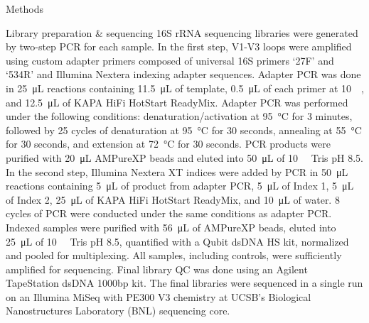 \documentclass[oneside,12pt,final]{sty/ucthesis-CA2012}
\begin{document}
\begin{mainmatter}
\begin{section}{Methods}
\begin{subsection}{Library preparation \& sequencing}
16S rRNA sequencing libraries were generated by two-step PCR for each sample. In the first step, V1-V3 loops were amplified using custom adapter primers composed of universal 16S primers ‘27F’ and ‘534R’ and Illumina Nextera indexing adapter sequences. Adapter PCR was done in \SI{25}{\micro\liter} reactions containing \SI{11.5}{\micro\liter} of template, \SI{0.5}{\micro\liter} of each primer at \SI{10}{\micro\molar}, and \SI{12.5}{\micro\liter} of KAPA HiFi HotStart ReadyMix. Adapter PCR was performed under the following conditions: denaturation/activation at \SI{95}{\celsius} for 3 minutes, followed by 25 cycles of denaturation at \SI{95}{\celsius} for 30 seconds, annealing at \SI{55}{\celsius} for 30 seconds, and extension at \SI{72}{\celsius} for 30 seconds. PCR products were purified with \SI{20}{\micro\liter} AMPureXP beads and eluted into \SI{50}{\micro\liter} of \SI{10}{\milli\molar} Tris pH 8.5. In the second step, Illumina Nextera XT indices were added by PCR in \SI{50}{\micro\liter} reactions containing \SI{5}{\micro\liter} of product from adapter PCR, \SI{5}{\micro\liter} of Index 1, \SI{5}{\micro\liter} of Index 2, \SI{25}{\micro\liter} of KAPA HiFi HotStart ReadyMix, and \SI{10}{\micro\liter} of water. 8 cycles of PCR were conducted under the same conditions as adapter PCR. Indexed samples were purified with \SI{56}{\micro\liter} of AMPureXP beads, eluted into \SI{25}{\micro\liter} of \SI{10}{\milli\molar} Tris pH 8.5, quantified with a Qubit dsDNA HS kit, normalized and pooled for multiplexing. All samples, including controls, were sufficiently amplified for sequencing. Final library QC was done using an Agilent TapeStation dsDNA 1000bp kit. The final libraries were sequenced in a single run on an Illumina MiSeq with PE300 V3 chemistry at UCSB’s Biological Nanostructures Laboratory (BNL) sequencing core.
\end{subsection}


\end{section}
\end{mainmatter}
\end{document}
